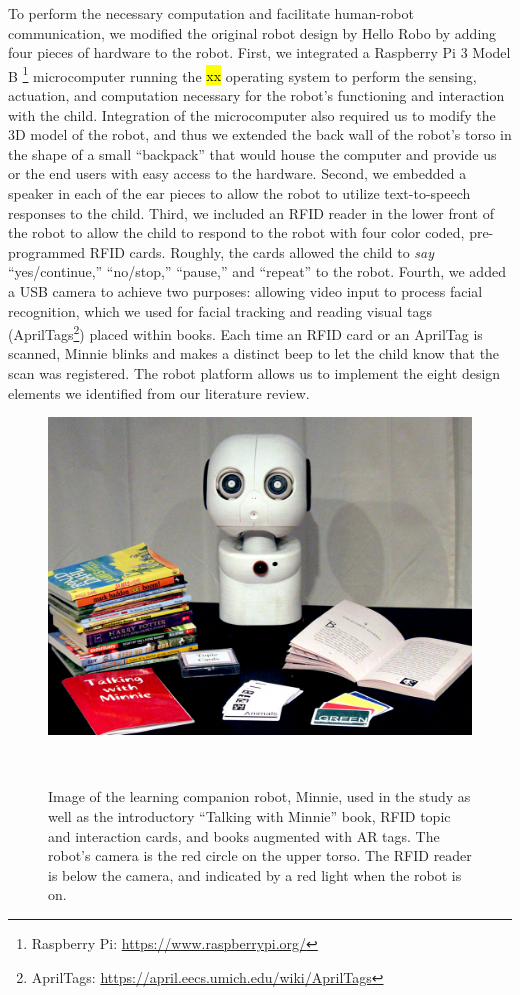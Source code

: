 \documentclass{sigchi}
\begin{document}
To perform the necessary computation and facilitate human-robot communication, we modified the original robot design by Hello Robo by adding four pieces of hardware to the robot. First, we integrated a Raspberry Pi 3 Model B \footnote{Raspberry Pi: \href{https://www.raspberrypi.org/}{https://www.raspberrypi.org/}} microcomputer running the \hl{xx} operating system to perform the sensing, actuation, and computation necessary for the robot's functioning and interaction with the child. Integration of the microcomputer also required us to modify the 3D model of the robot, and thus we extended the back wall of the robot's torso in the shape of a small ``backpack'' that would house the computer and provide us or the end users with easy access to the hardware. Second, we embedded a speaker in each of the ear pieces to allow the robot to utilize text-to-speech responses to the child. Third, we included an RFID reader in the lower front of the robot to allow the child to respond to the robot with four color coded, pre-programmed RFID cards. Roughly, the cards allowed the child to \textit{say} ``yes/continue,'' ``no/stop,'' ``pause,'' and ``repeat'' to the robot. Fourth, we added a USB camera to achieve two purposes: allowing video input to process facial recognition, which we used for facial tracking and reading visual tags (AprilTags\footnote{AprilTags: \href{https://april.eecs.umich.edu/wiki/AprilTags}{https://april.eecs.umich.edu/wiki/AprilTags} }) placed within books. Each time an RFID card or an AprilTag is scanned, Minnie blinks and makes a distinct beep to let the child know that the scan was registered. The robot platform allows us to implement the eight design elements we identified from our literature review.

\begin{figure}
	\centering
	\includegraphics[width=\columnwidth]{figures/Complete-Minnie-System.jpg}
	\caption{Image of the learning companion robot, Minnie, used in the study as well as the introductory ``Talking with Minnie'' book, RFID topic and interaction cards, and books augmented with AR tags. The robot's camera is the red circle on the upper torso. The RFID reader is below the camera, and indicated by a red light when the robot is on. }~\label{fig:complete-system}\vspace{-16pt}
\end{figure}
\end{document}
